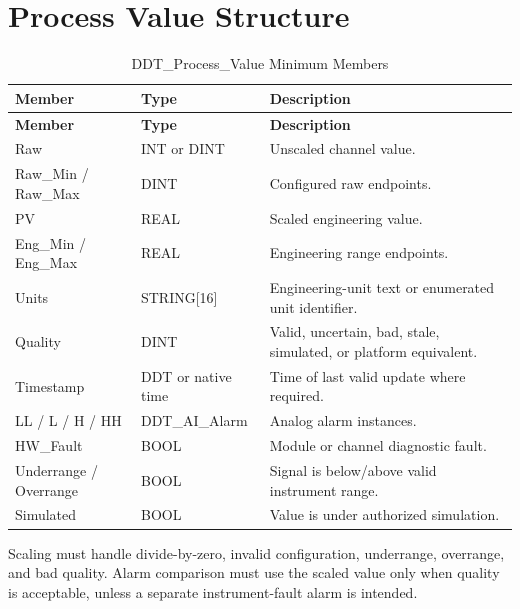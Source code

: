 \section{Process Value Structure}
\begin{longtable}{@{}p{3cm}p{3cm}p{7cm}@{}}
\caption{DDT\_Process\_Value Minimum Members}\label{tab:ddt-process-value}\\
\toprule \rowcolor{tblhead}\textbf{Member} & \textbf{Type} & \textbf{Description}\\ \midrule
\endfirsthead
\toprule \rowcolor{tblhead}\textbf{Member} & \textbf{Type} & \textbf{Description}\\ \midrule
\endhead
Raw & INT or DINT & Unscaled channel value.\\
Raw\_Min / Raw\_Max & DINT & Configured raw endpoints.\\
PV & REAL & Scaled engineering value.\\
Eng\_Min / Eng\_Max & REAL & Engineering range endpoints.\\
Units & STRING[16] & Engineering-unit text or enumerated unit identifier.\\
Quality & DINT & Valid, uncertain, bad, stale, simulated, or platform equivalent.\\
Timestamp & DDT or native time & Time of last valid update where required.\\
LL / L / H / HH & DDT\_AI\_Alarm & Analog alarm instances.\\
HW\_Fault & BOOL & Module or channel diagnostic fault.\\
Underrange / Overrange & BOOL & Signal is below/above valid instrument range.\\
Simulated & BOOL & Value is under authorized simulation.\\
\bottomrule
\end{longtable}

Scaling must handle divide-by-zero, invalid configuration, underrange, overrange, and bad quality. Alarm comparison must use the scaled value only when quality is acceptable, unless a separate instrument-fault alarm is intended.

